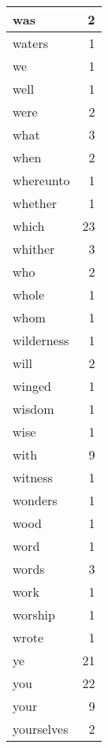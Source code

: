 \begin{center}
\begin{longtable}{l|r}
was & 2 \\ \hline
waters & 1 \\ \hline
we & 1 \\ \hline
well & 1 \\ \hline
were & 2 \\ \hline
what & 3 \\ \hline
when & 2 \\ \hline
whereunto & 1 \\ \hline
whether & 1 \\ \hline
which & 23 \\ \hline
whither & 3 \\ \hline
who & 2 \\ \hline
whole & 1 \\ \hline
whom & 1 \\ \hline
wilderness & 1 \\ \hline
will & 2 \\ \hline
winged & 1 \\ \hline
wisdom & 1 \\ \hline
wise & 1 \\ \hline
with & 9 \\ \hline
witness & 1 \\ \hline
wonders & 1 \\ \hline
wood & 1 \\ \hline
word & 1 \\ \hline
words & 3 \\ \hline
work & 1 \\ \hline
worship & 1 \\ \hline
wrote & 1 \\ \hline
ye & 21 \\ \hline
you & 22 \\ \hline
your & 9 \\ \hline
yourselves & 2 \\ \hline
\end{longtable}
\end{center}



\normalsize




